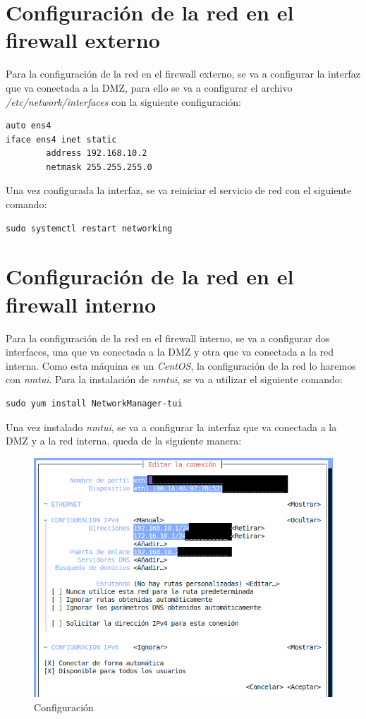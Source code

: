 \documentclass[11pt]{report}
\begin{document}
\section{Configuración de la red en el firewall externo}
Para la configuración de la red en el firewall externo, se va a configurar la interfaz que
va conectada a la DMZ, para ello se va a configurar el archivo \emph{/etc/network/interfaces}
con la siguiente configuración:
\begin{verbatim}
auto ens4
iface ens4 inet static
        address 192.168.10.2
        netmask 255.255.255.0
\end{verbatim}

Una vez configurada la interfaz, se va reiniciar el servicio de red con el siguiente comando: \\
\begin{BVerbatim}
sudo systemctl restart networking
\end{BVerbatim}

\cleardoublepage

\section{Configuración de la red en el firewall interno}
Para la configuración de la red en el firewall interno, se va a configurar dos interfaces, una
que va conectada a la DMZ y otra que va conectada a la red interna. Como esta máquina es un \emph{CentOS},
la configuración de la red lo haremos con \emph{nmtui}. Para la instalación de \emph{nmtui}, se va a utilizar
el siguiente comando:
\begin{BVerbatim}
sudo yum install NetworkManager-tui
\end{BVerbatim}

Una vez instalado \emph{nmtui}, se va a configurar la interfaz que va conectada a la DMZ y a la red interna, queda de la siguiente
manera:
\begin{figure}[H]
  \centering
  \includegraphics[scale=0.45]{img/fw-interno_interface.png}
  \caption{Configuración }
  \label{fig:Configuracion de la intefaz que va conectada a la DMZ y a la red interna}
\end{figure}
\end{document}
